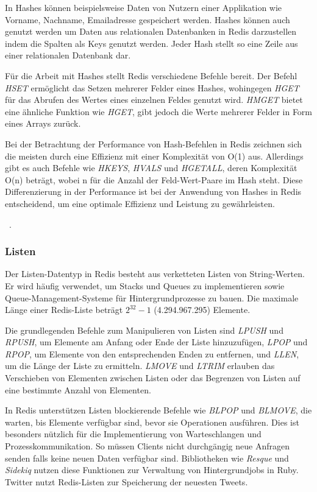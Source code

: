 In Hashes können beispielsweise Daten von Nutzern einer Applikation wie Vorname, Nachname, Emailadresse gespeichert werden.
Hashes können auch genutzt werden um Daten aus relationalen Datenbanken in Redis darzustellen indem die Spalten als Keys genutzt werden. Jeder Hash stellt so eine Zeile aus einer relationalen Datenbank dar.

Für die Arbeit mit Hashes stellt Redis verschiedene Befehle bereit. Der Befehl \emph{HSET} ermöglicht das Setzen mehrerer Felder eines Hashes, wohingegen \emph{HGET} für das Abrufen des Wertes eines einzelnen Feldes genutzt wird. \emph{HMGET} bietet eine ähnliche Funktion wie \emph{HGET}, gibt jedoch die Werte mehrerer Felder in Form eines Arrays zurück.

Bei der Betrachtung der Performance von Hash-Befehlen in Redis zeichnen sich die meisten durch eine Effizienz mit einer Komplexität von O(1) aus. Allerdings gibt es auch Befehle wie \emph{HKEYS}, \emph{HVALS} und \emph{HGETALL}, deren Komplexität O(n) beträgt, wobei n für die Anzahl der Feld-Wert-Paare im Hash steht. Diese Differenzierung in der Performance ist bei der Anwendung von Hashes in Redis entscheidend, um eine optimale Effizienz und Leistung zu gewährleisten.

~\cite{redis_ltd_hashes_nodate}.
\subsubsection{Listen}
Der Listen-Datentyp in Redis besteht aus verketteten Listen von String-Werten. Er wird häufig verwendet, um Stacks und Queues zu implementieren sowie Queue-Management-Systeme für Hintergrundprozesse zu bauen.
Die maximale Länge einer Redis-Liste beträgt \(2^{32} - 1\) (4.294.967.295) Elemente.

Die grundlegenden Befehle zum Manipulieren von Listen sind \emph{LPUSH} und \emph{RPUSH}, um Elemente am Anfang oder Ende der Liste hinzuzufügen, \emph{LPOP} und \emph{RPOP}, um Elemente von den entsprechenden Enden zu entfernen, und \emph{LLEN}, um die Länge der Liste zu ermitteln.
\emph{LMOVE} und \emph{LTRIM} erlauben das Verschieben von Elementen zwischen Listen oder das Begrenzen von Listen auf eine bestimmte Anzahl von Elementen.

In Redis unterstützen Listen blockierende Befehle wie \emph{BLPOP} und \emph{BLMOVE}, die warten, bis Elemente verfügbar sind, bevor sie Operationen ausführen.
Dies ist besonders nützlich für die Implementierung von Warteschlangen und Prozesskommunikation. So müssen Clients nicht durchgängig neue Anfragen senden falls keine neuen Daten verfügbar sind.
Bibliotheken wie \emph{Resque} und \emph{Sidekiq} nutzen diese Funktionen zur Verwaltung von Hintergrundjobs in Ruby.
Twitter nutzt Redis-Listen zur Speicherung der neuesten Tweets.


